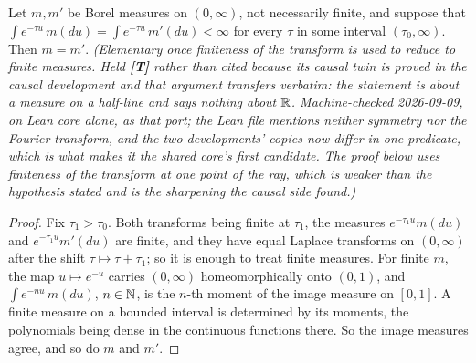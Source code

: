 \begin{proposition}
\label{prop:laplace-uniqueness-locally-finite}
\leanok
Let $m, m'$ be Borel measures on $(0,\infty)$, not necessarily finite, and suppose that
$\int e^{-\tau u}\,m(du) = \int e^{-\tau u}\,m'(du) < \infty$ for every $\tau$ in some
interval $(\tau_0,\infty)$. Then $m = m'$.
\statusT\quad\emph{(Elementary once finiteness of the transform is used to reduce to finite
measures. Held \textbf{[T]} rather than cited because its causal twin is proved in the causal
development and that argument transfers verbatim: the statement is about a measure on a
half-line and says nothing about $\mathbb{R}$. Machine-checked 2026-09-09, on Lean core alone, as that
port; the Lean file mentions neither symmetry nor the Fourier transform, and the two
developments' copies now differ in one predicate, which is what makes it the shared core's first
candidate. The proof below uses finiteness of the transform at \emph{one} point of the ray, which
is weaker than the hypothesis stated and is the sharpening the causal side found.)}
\end{proposition}

\begin{proof}\leanok
Fix $\tau_1 > \tau_0$. Both transforms being finite at $\tau_1$, the measures
$e^{-\tau_1 u}m(du)$ and $e^{-\tau_1 u}m'(du)$ are finite, and they have equal Laplace
transforms on $(0,\infty)$ after the shift $\tau \mapsto \tau + \tau_1$; so it is enough to
treat finite measures. For finite $m$, the map $u \mapsto e^{-u}$ carries $(0,\infty)$
homeomorphically onto $(0,1)$, and $\int e^{-n u}\,m(du)$, $n \in \mathbb{N}$, is the $n$-th moment
of the image measure on $[0,1]$. A finite measure on a bounded interval is determined by its
moments, the polynomials being dense in the continuous functions there. So the image measures
agree, and so do $m$ and $m'$.
\end{proof}


